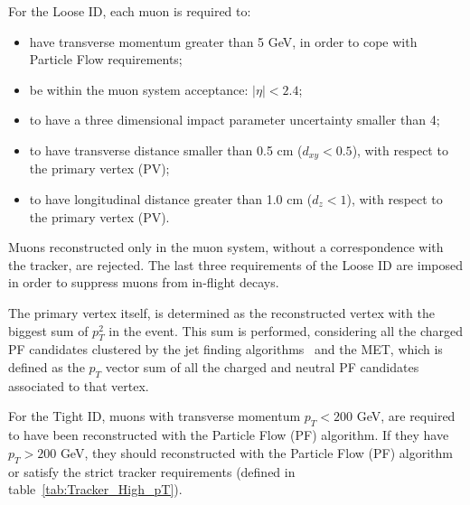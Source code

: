 For the Loose ID, each muon is required to:
\begin{itemize}
  \item have transverse momentum greater than 5 GeV, in order to cope with Particle Flow requirements;
  \item be within the muon system acceptance: $|\eta| < 2.4$;
  \item to have a three dimensional impact parameter uncertainty smaller than 4;
  \item to have transverse distance smaller than 0.5 cm ($d_{xy} < 0.5$), with respect to the primary vertex (PV);
  \item to have longitudinal distance greater than 1.0 cm ($d_{z} < 1$), with respect to the primary vertex (PV).

\end{itemize}

Muons reconstructed only in the muon system, without a correspondence with the tracker, are rejected. The last three requirements of the Loose ID are imposed in order to suppress muons from in-flight decays.

The primary vertex itself, is determined as the reconstructed vertex with the biggest sum of $p_T^2$ in the event. This sum is performed, considering all the charged PF candidates clustered by the jet finding algorithms~\cite{Cacciari:2008gp,Cacciari:2011ma} and the MET, which is defined as the $p_T$ vector sum of all the charged and neutral PF candidates associated to that vertex. 

For the Tight ID, muons with transverse momentum $p_{T} < 200$ GeV, are required to have been reconstructed with the Particle Flow (PF) algorithm. If they have $p_{T} > 200$ GeV, they should reconstructed with the Particle Flow (PF) algorithm or satisfy the strict tracker requirements (defined in table~\ref{tab:Tracker_High_pT}).

